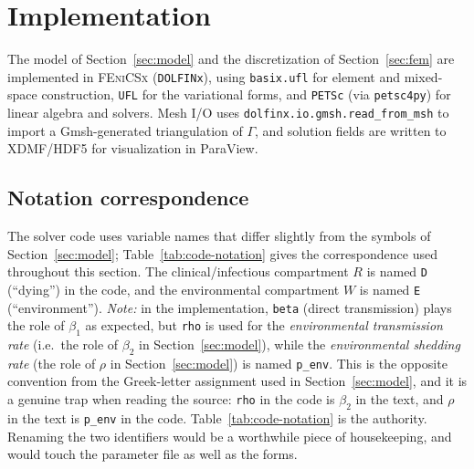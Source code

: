 \documentclass[11pt]{article}
\begin{document}
\section{Implementation}
\label{sec:implementation}

The model of Section~\ref{sec:model} and the discretization of Section~\ref{sec:fem} are implemented in \textsc{FEniCSx} (\texttt{DOLFINx}), using \texttt{basix.ufl} for element and mixed-space construction, \texttt{UFL} for the variational forms, and \texttt{PETSc} (via \texttt{petsc4py}) for linear algebra and solvers. Mesh I/O uses \texttt{dolfinx.io.gmsh.read\_from\_msh} to import a Gmsh-generated triangulation of $\Gamma$, and solution fields are written to XDMF/HDF5 for visualization in ParaView.

\subsection{Notation correspondence}

The solver code uses variable names that differ slightly from the symbols of Section~\ref{sec:model}; Table~\ref{tab:code-notation} gives the correspondence used throughout this section. The clinical/infectious compartment $R$ is named \texttt{D} (``dying'') in the code, and the environmental compartment $W$ is named \texttt{E} (``environment''). \emph{Note:} in the implementation, \texttt{beta} (direct transmission) plays the role of $\beta_1$ as expected, but \texttt{rho} is used for the \emph{environmental transmission rate} (i.e.\ the role of $\beta_2$ in Section~\ref{sec:model}), while the \emph{environmental shedding rate} (the role of $\rho$ in Section~\ref{sec:model}) is named \texttt{p\_env}. This is the opposite convention from the Greek-letter assignment used in Section~\ref{sec:model}, and it is a genuine trap when reading the source: \texttt{rho} in the code is $\beta_2$ in the text, and $\rho$ in the text is \texttt{p\_env} in the code. Table~\ref{tab:code-notation} is the authority. Renaming the two identifiers would be a worthwhile piece of housekeeping, and would touch the parameter file as well as the forms.
\end{document}
